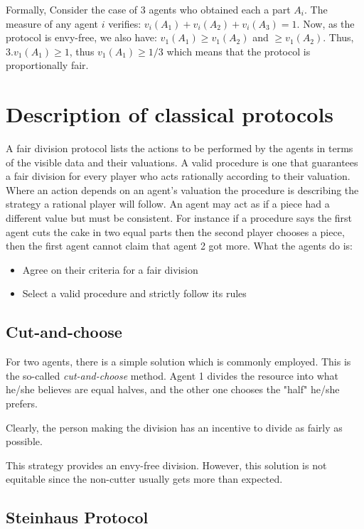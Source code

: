 Formally, Consider the case of $3$ agents who obtained each a part $A_i$.
The measure of any agent $i$ verifies: $v_i(A_1)+v_i(A_2)+v_i(A_3) = 1$.
Now, as the protocol is envy-free, we also have: $v_1(A_1) \geq v_1(A_2)$ and $\geq v_1(A_2)$.
Thus, $3.v_1(A_1) \geq 1$, thus $v_1(A_1) \geq 1/3$ which means that the protocol is proportionally fair. 

\section{Description of classical protocols}

A fair division protocol lists the actions to be performed by the agents in terms of the visible data and their valuations. 
A valid procedure is one that guarantees a fair division for every player who acts rationally according to their valuation. 
Where an action depends on an agent's valuation the procedure is describing the strategy a rational player will follow. 
An agent may act as if a piece had a different value but must be consistent. 
For instance if a procedure says the first agent cuts the cake in two equal parts then the second player chooses a piece, 
then the first agent cannot claim that agent 2 got more.
What the agents do is:
\begin{itemize}
\item Agree on their criteria for a fair division
\item Select a valid procedure and strictly follow its rules
\end{itemize}

\subsection{Cut-and-choose}

For two agents, there is a simple solution which is commonly employed. 
This is the so-called \textit{cut-and-choose} method. 
Agent 1 divides the resource into what he/she believes are equal halves, and the other one chooses the "half" he/she prefers. 

Clearly, the person making the division has an incentive to divide as fairly as possible. 

This strategy provides an envy-free division.
However, this solution is not equitable since the non-cutter usually gets more than expected.

\subsection{Steinhaus Protocol}

